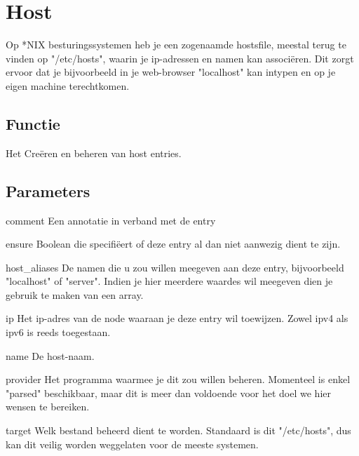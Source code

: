 \section{Host}
Op *NIX besturingssystemen heb je een zogenaamde hostsfile, meestal terug te vinden op "/etc/hosts", waarin je ip-adressen en namen kan associ\"{e}ren. Dit zorgt ervoor dat je bijvoorbeeld in je web-browser "localhost" kan intypen en op je eigen machine terechtkomen.

\subsection{Functie}
Het Cre\"{e}ren en beheren van host entries.

\subsection{Parameters}
comment
Een annotatie in verband met de entry

ensure
Boolean die specifi\"{e}ert of deze entry al dan niet aanwezig dient te zijn.

host_aliases
De namen die u zou willen meegeven aan deze entry, bijvoorbeeld "localhost" of "server". Indien je hier meerdere waardes wil meegeven dien je gebruik te maken van een array.

ip
Het ip-adres van de node waaraan je deze entry wil toewijzen. Zowel ipv4 als ipv6 is reeds toegestaan.

name
De host-naam.

provider
Het programma waarmee je dit zou willen beheren. Momenteel is enkel "parsed" beschikbaar, maar dit is meer dan voldoende voor het doel we hier wensen te bereiken.

target
Welk bestand beheerd dient te worden. Standaard is dit "/etc/hosts", dus kan dit veilig worden weggelaten voor de meeste systemen.
